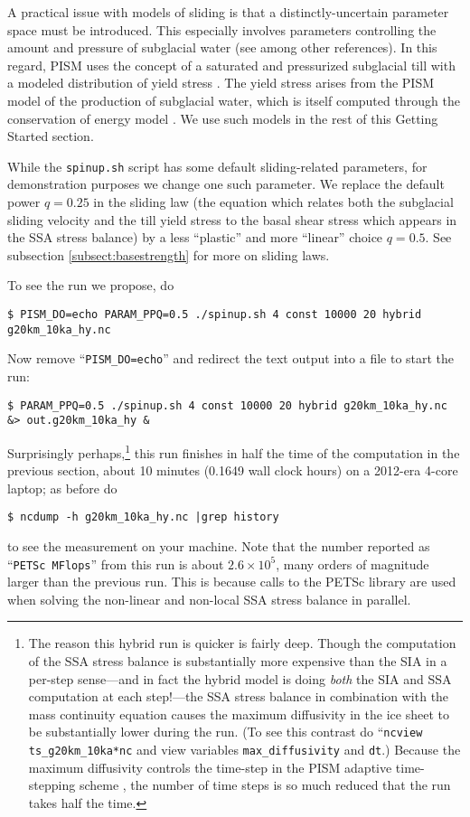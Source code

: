 A practical issue with models of sliding is that a distinctly-uncertain parameter space must be introduced.  This especially involves parameters controlling the amount and pressure of subglacial water (see \cite{AschwandenAdalgeirsdottirKhroulev,Clarke05,Tulaczyketal2000,vanPeltOerlemans2012} among other references).  In this regard, PISM uses the concept of a saturated and pressurized subglacial till with a modeled distribution of yield stress  \cite{BBssasliding,SchoofStream}.  The yield stress arises from the PISM model of the production of subglacial water, which is itself computed through the conservation of energy model \cite{AschwandenBuelerKhroulevBlatter}.  We use such models in the rest of this Getting Started section.

While the \texttt{spinup.sh} script has some default sliding-related parameters, for demonstration purposes we change one such parameter.  We replace the default power $q=0.25$ in the sliding law (the equation which relates both the subglacial sliding velocity and the till yield stress to the basal shear stress which appears in the SSA stress balance) by a less ``plastic'' and more ``linear'' choice $q=0.5$.  See subsection \ref{subsect:basestrength} for more on sliding laws.

To see the run we propose, do
\begin{verbatim}
$ PISM_DO=echo PARAM_PPQ=0.5 ./spinup.sh 4 const 10000 20 hybrid g20km_10ka_hy.nc
\end{verbatim}
Now remove ``\texttt{PISM_DO=echo}'' and redirect the text output into a file to start the run:
\begin{verbatim}
$ PARAM_PPQ=0.5 ./spinup.sh 4 const 10000 20 hybrid g20km_10ka_hy.nc &> out.g20km_10ka_hy &
\end{verbatim}

Surprisingly perhaps,\footnote{The reason this hybrid run is quicker is fairly deep.  Though the computation of the SSA stress balance is substantially more expensive than the SIA in a per-step sense---and in fact the hybrid model is doing \emph{both} the SIA and SSA computation at each step!---the SSA stress balance in combination with the mass continuity equation causes the maximum diffusivity in the ice sheet to be substantially lower during the run.  (To see this contrast do ``\texttt{ncview ts_g20km_10ka*nc} and view variables \texttt{max_diffusivity} and \texttt{dt}.)  Because the maximum diffusivity controls the time-step in the PISM adaptive time-stepping scheme \cite{BBL}, the number of time steps is so much reduced that the run takes half the time.} this run finishes in half the time of the computation in the previous section, about 10 minutes (0.1649 wall clock hours) on a 2012-era 4-core laptop; as before do
\begin{verbatim}
$ ncdump -h g20km_10ka_hy.nc |grep history
\end{verbatim}
to see the measurement on your machine.  Note that the number reported as ``\texttt{PETSc MFlops}'' from this run is about $2.6 \times 10^5$, many orders of magnitude larger than the previous run.  This is because calls to the PETSc library are used when solving the non-linear and non-local SSA stress balance in parallel.

